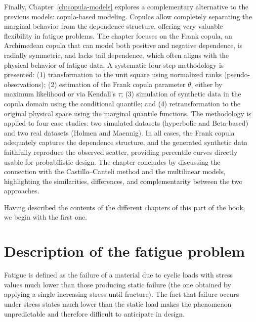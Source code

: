 Finally, Chapter~\ref{ch:copula-models} explores a complementary alternative to the previous models: copula-based modeling. Copulas allow completely separating the marginal behavior from the dependence structure, offering very valuable flexibility in fatigue problems. The chapter focuses on the Frank copula, an Archimedean copula that can model both positive and negative dependence, is radially symmetric, and lacks tail dependence, which often aligns with the physical behavior of fatigue data. A systematic four-step methodology is presented: (1) transformation to the unit square using normalized ranks (pseudo-observations); (2) estimation of the Frank copula parameter $\theta$, either by maximum likelihood or via Kendall's $\tau$; (3) simulation of synthetic data in the copula domain using the conditional quantile; and (4) retransformation to the original physical space using the marginal quantile functions. The methodology is applied to four case studies: two simulated datasets (hyperbolic and Beta-based) and two real datasets (Holmen and Maennig). In all cases, the Frank copula adequately captures the dependence structure, and the generated synthetic data faithfully reproduce the observed scatter, providing percentile curves directly usable for probabilistic design. The chapter concludes by discussing the connection with the Castillo–Canteli method and the multilinear models, highlighting the similarities, differences, and complementarity between the two approaches.


Having described the contents of the different chapters of this part of the book, we begin with the first one.

\section{Description of the fatigue problem}

Fatigue is defined as the failure of a material due to cyclic loads with stress values much lower than those producing static failure (the one obtained by applying a single increasing stress until fracture). The fact that failure occurs under stress states much lower than the static load makes the phenomenon unpredictable and therefore difficult to anticipate in design.

